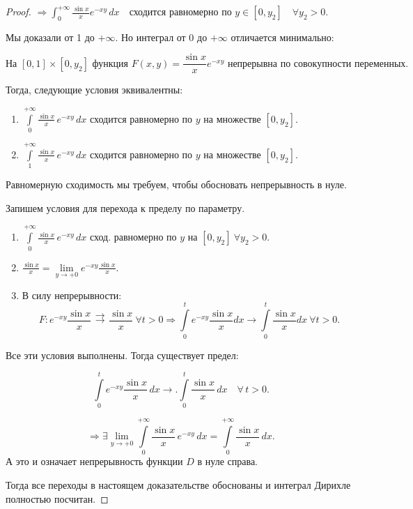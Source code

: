 \begin{proof}
\noindent $\Rightarrow  \int_{0}^{+\infty} \frac{\sin x}{x} e^{-x y} \, dx \quad \text{сходится равномерно по } y \in [0, y_2] \quad \forall y_2 > 0. $

\begin{note}
Мы доказали от 1 до $+\infty$. Но интеграл от 0 до $+\infty$ отличается минимально:
\end{note}
\[
\text{На } [0, 1] \times [0, y_2] \text{ функция } F(x, y) = \frac{\sin x}{x} e^{-x y} \text{ непрерывна по совокупности переменных.}
\]

\noindent Тогда, следующие условия эквивалентны:

\begin{enumerate}
    \item \(\int\limits_0^{+\infty} \frac{\sin x}{x} \, e^{-x y} \, dx \) сходится равномерно по \( y \) на множестве \( [0, y_2] \).

    \item \(\int\limits_1^{+\infty} \frac{\sin x}{x} \, e^{-x y} \, dx \) сходится равномерно по \( y \) на множестве \( [0, y_2] \).
\end{enumerate}

\noindent Равномерную сходимость мы требуем, чтобы обосновать непрерывность в нуле.

\noindent Запишем условия для перехода к пределу по параметру.

\begin{enumerate}
    \item $\int\limits_0^{+\infty} \frac{\sin x}{x} \, e^{-x y} \, dx$ сход. равномерно по $y$ на $[0, y_2 ] \ \forall y_2 > 0.$

    \item $\frac{\sin x}{x} = \lim\limits_{y \to +0} e^{-x y} \frac{\sin x}{x}.$


    \item В силу непрерывности:
    $$
    F: e^{-x y} \frac{\sin x}{x} \mathrel{\substack{\rightrightarrows \\ [0, t]}} \dfrac{\sin x}{x}  \ \forall t > 0 \Rightarrow \int\limits_{0}^{t} e^{-xy} \dfrac{\sin x}{x} dx \rightarrow \int\limits_{0}^{t} \dfrac{\sin x}{x} dx \ \forall t > 0.
    $$

\end{enumerate}

\noindent Все эти условия выполнены. Тогда существует предел:

\[
\int\limits_0^{t} e^{-x y} \frac{\sin x}{x} \, dx
\longrightarrow.
\int\limits_0^{t} \frac{\sin x}{x} \, dx \quad \forall\, t > 0.
\]


\[
\Rightarrow \exists \lim_{y \to +0} \int\limits_0^{+\infty} \frac{\sin x}{x} \, e^{-x y} \, dx
= \int\limits_0^{+\infty} \frac{\sin x}{x} \, dx.
\]
А это и означает непрерывность функции $D$ в нуле справа.

\noindent Тогда  все переходы в настоящем доказательстве обоснованы и интеграл Дирихле полностью посчитан.

\end{proof}


